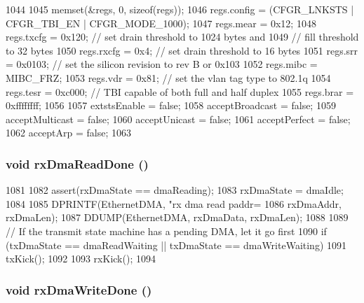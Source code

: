\begin{DoxyCode}
1044 {
1045     memset(&regs, 0, sizeof(regs));
1046     regs.config = (CFGR_LNKSTS | CFGR_TBI_EN | CFGR_MODE_1000);
1047     regs.mear = 0x12;
1048     regs.txcfg = 0x120; // set drain threshold to 1024 bytes and
1049                         // fill threshold to 32 bytes
1050     regs.rxcfg = 0x4;   // set drain threshold to 16 bytes
1051     regs.srr = 0x0103;  // set the silicon revision to rev B or 0x103
1052     regs.mibc = MIBC_FRZ;
1053     regs.vdr = 0x81;    // set the vlan tag type to 802.1q
1054     regs.tesr = 0xc000; // TBI capable of both full and half duplex
1055     regs.brar = 0xffffffff;
1056 
1057     extstsEnable = false;
1058     acceptBroadcast = false;
1059     acceptMulticast = false;
1060     acceptUnicast = false;
1061     acceptPerfect = false;
1062     acceptArp = false;
1063 }
\end{DoxyCode}
\hypertarget{classNSGigE_a1124e0dc2f6fa5b5f20f4ee918f5c83e}{
\subsubsection[{rxDmaReadDone}]{\setlength{\rightskip}{0pt plus 5cm}void rxDmaReadDone ()}}
\label{classNSGigE_a1124e0dc2f6fa5b5f20f4ee918f5c83e}



\begin{DoxyCode}
1081 {
1082     assert(rxDmaState == dmaReading);
1083     rxDmaState = dmaIdle;
1084 
1085     DPRINTF(EthernetDMA, "rx dma read  paddr=%
1086             rxDmaAddr, rxDmaLen);
1087     DDUMP(EthernetDMA, rxDmaData, rxDmaLen);
1088 
1089     // If the transmit state machine has a pending DMA, let it go first
1090     if (txDmaState == dmaReadWaiting || txDmaState == dmaWriteWaiting)
1091         txKick();
1092 
1093     rxKick();
1094 }
\end{DoxyCode}
\hypertarget{classNSGigE_a932a4e848e07e1c3ece5cd2c2ee272a8}{
\subsubsection[{rxDmaWriteDone}]{\setlength{\rightskip}{0pt plus 5cm}void rxDmaWriteDone ()}}
\label{classNSGigE_a932a4e848e07e1c3ece5cd2c2ee272a8}



